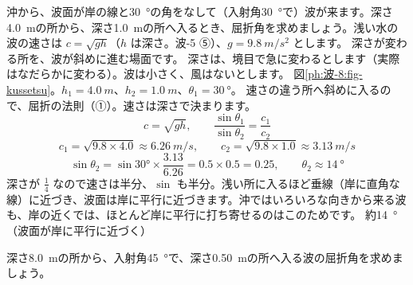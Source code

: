\label{ph:波-8:ex4}
\begin{phreidai}
沖から、波面が岸の線と\qty{30}{\degree}の角をなして（入射角\qty{30}{\degree}で）波が来ます。深さ\qty{4.0}{m}の所から、深さ\qty{1.0}{m}の所へ入るとき、屈折角を求めましょう。浅い水の波の速さは $c=\sqrt{gh}$（$h$ は深さ。波-5 ⑤）、$g=\qty{9.8}{m/s^2}$ とします。
\phbamen
深さが変わる所を、波が斜めに進む場面です。
\phmushi
深さは、境目で急に変わるとします（実際はなだらかに変わる）。波は小さく、風はないとします。
\phzu
図\ref{ph:波-8:fig-kussetsu}。$h_1=\qty{4.0}{m}$、$h_2=\qty{1.0}{m}$、$\theta_1=\qty{30}{\degree}$。
\phriyu
速さの違う所へ斜めに入るので、屈折の法則（①）。速さは深さで決まります。
\phtateru
\[c=\sqrt{gh},\qquad\frac{\sin\theta_1}{\sin\theta_2}=\frac{c_1}{c_2}\]
\phtoku
\[c_1=\sqrt{9.8\times4.0}\approx\qty{6.26}{m/s},\qquad c_2=\sqrt{9.8\times1.0}\approx\qty{3.13}{m/s}\]
\[\sin\theta_2=\sin30°\times\frac{3.13}{6.26}=0.5\times0.5=0.25,\qquad\theta_2\approx\qty{14}{\degree}\]
\phtashikame
深さが $\tfrac14$ なので速さは半分、$\sin$ も半分。浅い所に入るほど垂線（岸に直角な線）に近づき、波面は岸に平行に近づきます。沖ではいろいろな向きから来る波も、岸の近くでは、ほとんど岸に平行に打ち寄せるのはこのためです。
\kotae 約\qty{14}{\degree}（波面が岸に平行に近づく）
\end{phreidai}
\begin{jibun}
深さ\qty{8.0}{m}の所から、入射角\qty{45}{\degree}で、深さ\qty{0.50}{m}の所へ入る波の屈折角を求めましょう。
\end{jibun}

